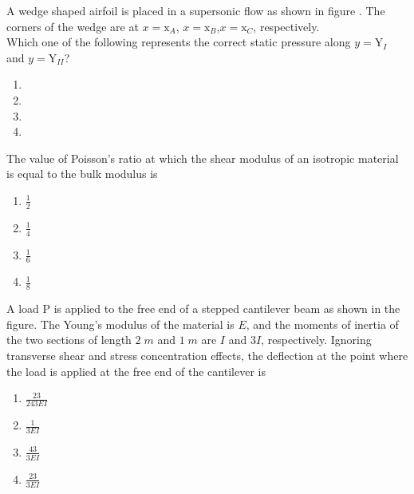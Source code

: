 \item A wedge shaped airfoil is placed in a supersonic flow as shown in figure . The corners of the wedge are at $x=\text{x}_A$, $x=\text{x}_B$,\;$x=\text{x}_C$, respectively.\\

Which one of the following represents the correct static pressure along $y=\text{Y}_I$ and $y=\text{Y}_{II}$?
\begin{enumerate}
    \item 

    \item 

    \item 
 
    \item 

\end{enumerate}
\item The value of Poisson's ratio at which the shear modulus of an isotropic material is equal to the bulk modulus is
\begin{enumerate}
    \item $\frac{1}{2}$
    \item $\frac{1}{4}$
    \item $\frac{1}{6}$
    \item $\frac{1}{8}$
\end{enumerate}
\item A load P is applied to the free end of a stepped cantilever beam as shown in the figure. The Young's modulus of the material is $E$, and the moments of inertia of the two sections of length $2\;m$ and $1\;m$ are $I$ and $3I$, respectively. Ignoring transverse shear and stress concentration effects, the deflection at the point where the load is applied at the free end of the cantilever is  

\begin{enumerate}
    \item $\frac{23}{243EI}$
    \item $\frac{1}{3EI}$
    \item $\frac{43}{3EI}$
    \item $\frac{23}{3EI}$
\end{enumerate}


